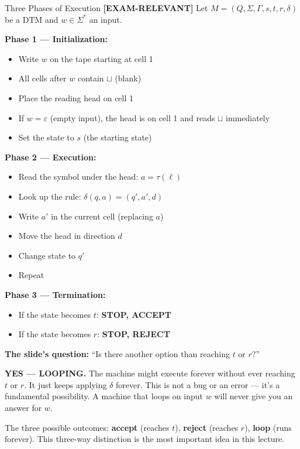 \documentclass[11pt,a4paper]{article}
\newcommand{\kemark}{\textcolor{red!70!black}{\textbf{[EXAM-RELEVANT]}}}
\newcommand{\kt}[1]{\par\vspace{0.3em}\colorbox{yellow!60}{\parbox{\dimexpr\linewidth-2\fboxsep}{#1}}\vspace{0.3em}}
\begin{document}
\begin{notebox}{Three Phases of Execution \kemark}
Let $M = (Q, \Sigma, \Gamma, s, t, r, \delta)$ be a DTM and $w \in \Sigma^*$ an input.

\textbf{Phase 1 --- Initialization:}
\begin{itemize}[nosep]
\item Write $w$ on the tape starting at cell 1
\item All cells after $w$ contain $\sqcup$ (blank)
\item Place the reading head on cell 1
\item If $w = \varepsilon$ (empty input), the head is on cell 1 and reads $\sqcup$ immediately
\item Set the state to $s$ (the starting state)
\end{itemize}

\textbf{Phase 2 --- Execution:}
\begin{itemize}[nosep]
\item Read the symbol under the head: $a = \tau(\ell)$
\item Look up the rule: $\delta(q, a) = (q', a', d)$
\item Write $a'$ in the current cell (replacing $a$)
\item Move the head in direction $d$
\item Change state to $q'$
\item Repeat
\end{itemize}

\textbf{Phase 3 --- Termination:}
\begin{itemize}[nosep]
\item If the state becomes $t$: \textbf{STOP, ACCEPT}
\item If the state becomes $r$: \textbf{STOP, REJECT}
\end{itemize}

\textbf{The slide's question:} ``Is there another option than reaching $t$ or $r$?''

\textbf{YES --- LOOPING.} The machine might execute forever without ever reaching $t$ or $r$. It just keeps applying $\delta$ forever. This is not a bug or an error --- it's a fundamental possibility. A machine that loops on input $w$ will never give you an answer for $w$.

\kt{The three possible outcomes: \textbf{accept} (reaches $t$), \textbf{reject} (reaches $r$), \textbf{loop} (runs forever). This three-way distinction is the most important idea in this lecture.}
\end{notebox}
\end{document}
